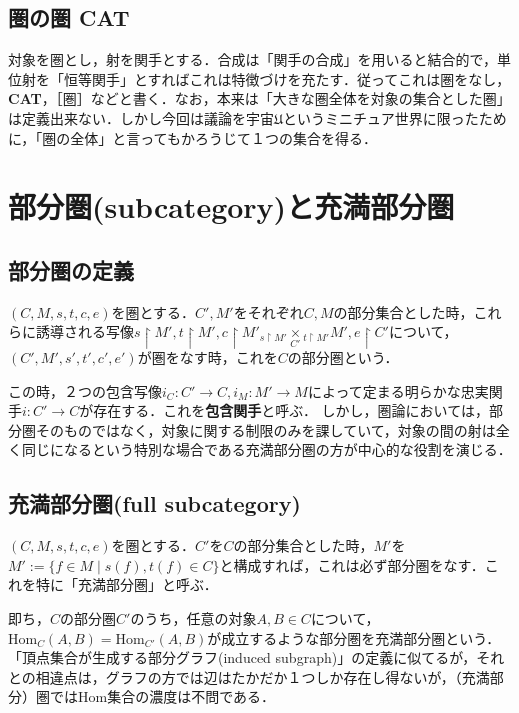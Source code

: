 \documentclass[uplatex, 12pt, dvipdfmx]{jsreport}
\begin{document}
\subsection{圏の圏 \bf{CAT}}
対象を圏とし，射を関手とする．合成は「関手の合成」を用いると結合的で，単位射を「恒等関手」とすればこれは特徴づけを充たす．従ってこれは圏をなし，\textbf{CAT}，［圏］などと書く．なお，本来は「大きな圏全体を対象の集合とした圏」は定義出来ない．しかし今回は議論を宇宙$\mathfrak{U}$というミニチュア世界に限ったために，「圏の全体」と言ってもかろうじて１つの集合を得る．

\section{部分圏(subcategory)と充満部分圏}

\subsection{部分圏の定義}
\begin{shadebox}\begin{definition}[部分圏]
    $(C,M,s,t,c,e)$を圏とする．$C',M'$をそれぞれ$C,M$の部分集合とした時，これらに誘導される写像$s\upharpoonright M', t\upharpoonright M', c\upharpoonright M'_{s\upharpoonright M'}\underset{C'}{\times}{}_{t\upharpoonright M'}M', e\upharpoonright C'$について，$(C',M',s', t', c', e')$が圏をなす時，これを$C$の部分圏という．
\end{definition}\end{shadebox}
この時，２つの包含写像$i_C:C'\rightarrow C, i_M:M'\rightarrow M$によって定まる明らかな忠実関手$i:C'\rightarrow C$が存在する．これを\textbf{包含関手}と呼ぶ．
しかし，圏論においては，部分圏そのものではなく，対象に関する制限のみを課していて，対象の間の射は全く同じになるという特別な場合である充満部分圏の方が中心的な役割を演じる．

\subsection{充満部分圏(full subcategory)}
\begin{shadebox}\begin{definition}[充満部分圏]
    $(C,M,s,t,c,e)$を圏とする．$C'$を$C$の部分集合とした時，$M'$を$M':=\{ f\in M \mid s(f), t(f)\in C \}$と構成すれば，これは必ず部分圏をなす．これを特に「充満部分圏」と呼ぶ．
\end{definition}\end{shadebox}
即ち，$C$の部分圏$C'$のうち，任意の対象$A,B\in C$について，$\mathrm{Hom}_C(A,B)=\mathrm{Hom}_{C'}(A,B)$が成立するような部分圏を充満部分圏という．「頂点集合が生成する部分グラフ(induced subgraph)」の定義に似てるが，それとの相違点は，グラフの方では辺はたかだか１つしか存在し得ないが，（充満部分）圏ではHom集合の濃度は不問である．
\end{document}
